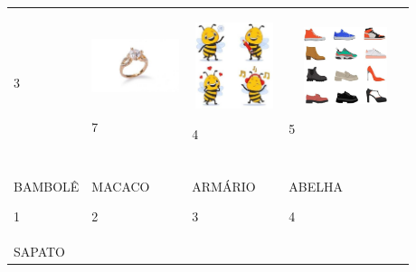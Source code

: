 \begin{longtable}[]{@{}llll@{}}
\begin{minipage}[t]{0.24\columnwidth}
3\strut
\end{minipage} & \begin{minipage}[t]{0.24\columnwidth}\raggedright\strut
\includegraphics[width=1.00972in,height=0.84375in]{media/image119.jpg}

7\strut
\end{minipage} & \begin{minipage}[t]{0.24\columnwidth}\raggedright\strut
\includegraphics[width=0.96875in,height=0.99167in]{media/image120.jpg}

4\strut
\end{minipage} & \begin{minipage}[t]{0.24\columnwidth}\raggedright\strut
\includegraphics[width=1.30694in,height=0.88542in]{media/image121.jpg}

5\strut
\end{minipage}\tabularnewline
& & &\tabularnewline
\begin{minipage}[t]{0.24\columnwidth}\raggedright\strut
BAMBOLÊ

1\strut
\end{minipage} & \begin{minipage}[t]{0.24\columnwidth}\raggedright\strut
MACACO

2\strut
\end{minipage} & \begin{minipage}[t]{0.24\columnwidth}\raggedright\strut
ARMÁRIO

3\strut
\end{minipage} & \begin{minipage}[t]{0.24\columnwidth}\raggedright\strut
ABELHA

4\strut
\end{minipage}\tabularnewline
\begin{minipage}[t]{0.24\columnwidth}\raggedright\strut
SAPATO


\end{minipage}
\end{longtable}
